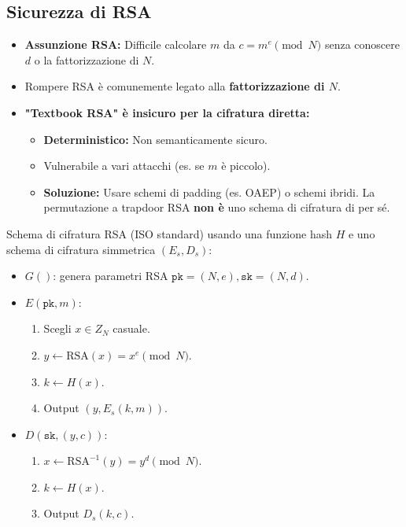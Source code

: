\subsection{Sicurezza di RSA}
\begin{itemize}
    \item \textbf{Assunzione RSA:} Difficile calcolare $m$ da $c=m^e \pmod N$ senza conoscere $d$ o la fattorizzazione di $N$.
    \item Rompere RSA è comunemente legato alla \textbf{fattorizzazione di $N$}.
    \item \textbf{"Textbook RSA" è insicuro per la cifratura diretta:}
    \begin{itemize}
        \item \textbf{Deterministico:} Non semanticamente sicuro.
        \item Vulnerabile a vari attacchi (es. se $m$ è piccolo).
        \item \textbf{Soluzione:} Usare schemi di padding (es. OAEP) o schemi ibridi.
        La permutazione a trapdoor RSA \textbf{non è} uno schema di cifratura di per sé.
    \end{itemize}
\end{itemize}
Schema di cifratura RSA (ISO standard) usando una funzione hash $H$ e uno schema di cifratura simmetrica $(E_s, D_s)$:
\begin{itemize}
    \item $G()$: genera parametri RSA $\texttt{pk}=(N,e), \texttt{sk}=(N,d)$.
    \item $E(\texttt{pk}, m)$:
        \begin{enumerate}
            \item Scegli $x \in Z_N$ casuale.
            \item $y \leftarrow \text{RSA}(x) = x^e \pmod N$.
            \item $k \leftarrow H(x)$.
            \item Output $(y, E_s(k,m))$.
        \end{enumerate}
    \item $D(\texttt{sk}, (y,c))$:
        \begin{enumerate}
            \item $x \leftarrow \text{RSA}^{-1}(y) = y^d \pmod N$.
            \item $k \leftarrow H(x)$.
            \item Output $D_s(k,c)$.
        \end{enumerate}
\end{itemize}


